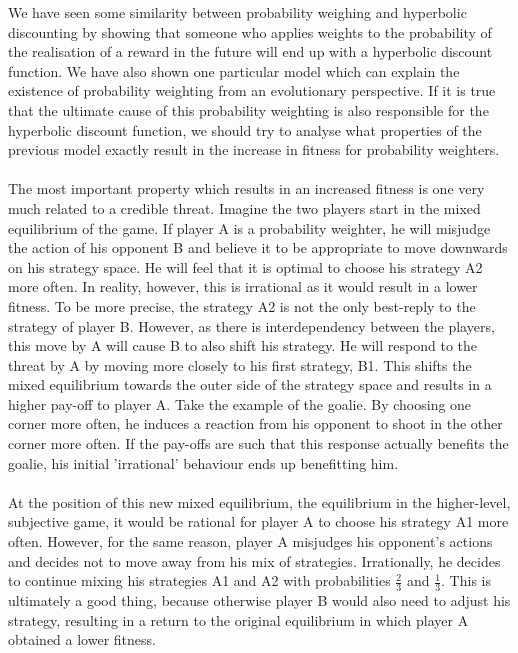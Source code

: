 \documentclass[a4paper,10pt]{article}
\numberwithin{equation}{section}
\begin{document}
We have seen some similarity between probability weighing and hyperbolic discounting by showing that someone who applies weights to the probability of the realisation of a reward in the future will end up with a hyperbolic discount function. We have also shown one particular model which can explain the existence of probability weighting from an evolutionary perspective. If it is true that the ultimate cause of this probability weighting is also responsible for the hyperbolic discount function, we should try to analyse what properties of the previous model exactly result in the increase in fitness for probability weighters.\\
\\
The most important property which results in an increased fitness is one very much related to a credible threat. Imagine the two players start in the mixed equilibrium of the game. If player A is a probability weighter, he will misjudge the action of his opponent B and believe it to be appropriate to move downwards on his strategy space. He will feel that it is optimal to choose his strategy A2 more often. In reality, however, this is irrational as it would result in a lower fitness. To be more precise, the strategy A2 is not the only best-reply to the strategy of player B. However, as there is interdependency between the players, this move by A will cause B to also shift his strategy. He will respond to the threat by A by moving more closely to his first strategy, B1. This shifts the mixed equilibrium towards the outer side of the strategy space and results in a higher pay-off to player A. Take the example of the goalie. By choosing one corner more often, he induces a reaction from his opponent to shoot in the other corner more often. If the pay-offs are such that this response actually benefits the goalie, his initial 'irrational' behaviour ends up benefitting him.\\
\\
At the position of this new mixed equilibrium, the equilibrium in the higher-level, subjective game, it would be rational for player A to choose his strategy A1 more often. However, for the same reason, player A misjudges his opponent's actions and decides not to move away from his mix of strategies. Irrationally, he decides to continue mixing his strategies A1 and A2 with probabilities $\frac{2}{3}$ and $\frac{1}{3}$. This is ultimately a good thing, because otherwise player B would also need to adjust his strategy, resulting in a return to the original equilibrium in which player A obtained a lower fitness.
\end{document}
